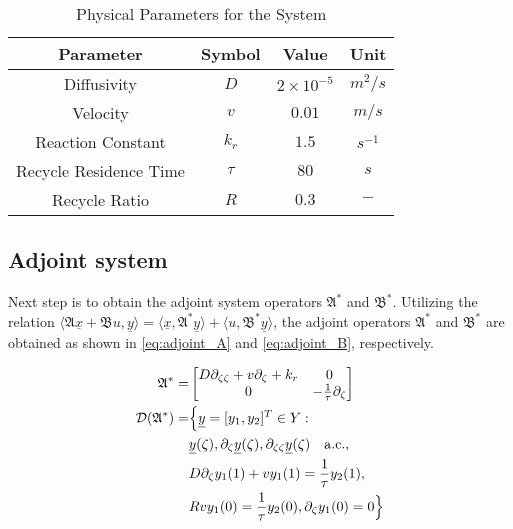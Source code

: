 \begin{table}[ht]
    \centering
    \caption{Physical Parameters for the System}
    \label{tab:pars}
    \begin{tabular}{|c|c|c|c|}
    \hline
    \textbf{Parameter}        & \textbf{Symbol} & \textbf{Value}     & \textbf{Unit}    \\ \hline
    Diffusivity               & $D$             & $2\times10^{-5}$   & ${m^2}/{s}$      \\ \hline
    Velocity                  & $v$             & $0.01$   & ${m}/{s}$        \\ \hline
    Reaction Constant         & $k_r$           & $1.5$              & $s^{-1}$         \\ \hline
    Recycle Residence Time    & $\tau$          & $80$               & $s$              \\ \hline
    Recycle Ratio             & $R$             & $0.3$              & $-$              \\ \hline
    \end{tabular}
\end{table}

\subsection{Adjoint system}

Next step is to obtain the adjoint system operators $\mathfrak{A}^*$ and $\mathfrak{B}^*$. Utilizing the relation $\langle \mathfrak{A} \underline{x} + \mathfrak{B} u, \underline{y}\rangle = \langle \underline{x}, \mathfrak{A}^* \underline{y}\rangle + \langle u, \mathfrak{B}^* \underline{y}\rangle$, the adjoint operators $\mathfrak{A}^*$ and $\mathfrak{B}^*$ are obtained as shown in \eqref{eq:adjoint_A} and \eqref{eq:adjoint_B}, respectively.


\begin{equation} \label{eq:adjoint_A}
    \begin{aligned}
        {\mathfrak{A}}^{*} =&
        \begin{bmatrix}
            D \partial_{\zeta \zeta} + v \partial_\zeta +k_r & 0\\
            0 & -\frac{1}{\tau} \partial_\zeta
        \end{bmatrix}\\
        \mathcal{D}(\mathfrak{A}^*) =& \Bigl\{ \underline{y} = [y_1, y_2]^T \in Y:\\
        &\underline{y}(\zeta), \partial_\zeta \underline{y}(\zeta), \partial_{\zeta \zeta} \underline{y}(\zeta) \quad \mathrm{a.c.},\\
        &D \partial_\zeta y_1(1) + v y_1(1) = \frac{1}{\tau} y_2(1), \\
        &R v y_1(0) = \frac{1}{\tau} y_2(0), 
        \partial_\zeta y_1(0) = 0 \Bigr\}
    \end{aligned}
\end{equation}

